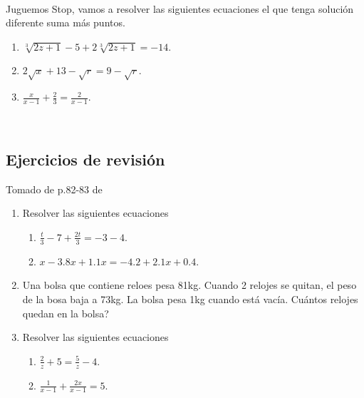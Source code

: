 \begin{exers}{\ \\}
Juguemos Stop, vamos a resolver las siguientes ecuaciones el que tenga solución diferente suma más puntos.
\begin{enumerate}
\item $\sqrt[3]{2z+1} - 5 + 2 \sqrt[3]{2z+1} = -14$.
\item $2\sqrt{x} +13-\sqrt{r} = 9 - \sqrt{r}$.
\item $\frac{x}{x-1} + \frac{2}{3} = \frac{2}{x-1} $.
\end{enumerate}
\end{exers}

\newpage
\begin{exers}{\ \\}
\begin{center}
	\vspace{-5mm}
	\section*{Ejercicios de revisión}\label{section_ejercicios_ecuaciones_lineales_de_una_variable}
\end{center}
Tomado de p.82-83 de \cite{Aops_algebra}
\begin{enumerate}
\item Resolver las siguientes ecuaciones	
		\begin{multicols}{2}
		\begin{enumerate}[label=\Alph*)]
		\item $\frac{t}{3}-7+\frac{2t}{3}=-3-4$.
		\item $x-3.8x+1.1x=-4.2+2.1x+0.4$.
		\end{enumerate}
		\end{multicols}

\item Una bolsa que contiene reloes pesa 81kg. Cuando 2 relojes se quitan, el peso de la bosa baja a 73kg. La bolsa pesa 1kg cuando está vacía. Cuántos relojes quedan en la bolsa?

\item Resolver las siguientes ecuaciones	
		\begin{multicols}{2}
			\begin{enumerate}[label=\Alph*)]
				\item $\frac{2}{z}+5=\frac{5}{z} -4$.
				\item $\frac{1}{x-1} + \frac{2x}{x-1}=5$.
			\end{enumerate}
		\end{multicols}


\end{enumerate}
\end{exers}

